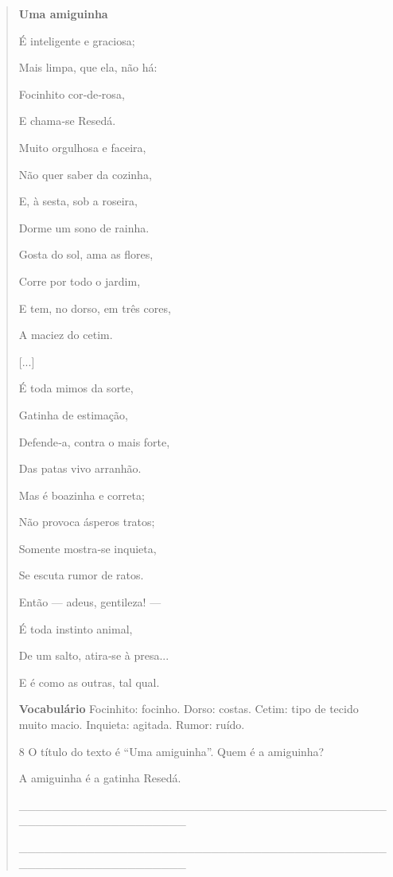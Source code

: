 \begin{quote}
\textbf{Uma amiguinha}

É inteligente e graciosa;

Mais limpa, que ela, não há:

Focinhito cor‑de‑rosa,

E chama‑se Resedá.


Muito orgulhosa e faceira,

Não quer saber da cozinha,

E, à sesta, sob a roseira,

Dorme um sono de rainha.


Gosta do sol, ama as flores,

Corre por todo o jardim,

E tem, no dorso, em três cores,

A maciez do cetim.


{[}...{]}


É toda mimos da sorte,

Gatinha de estimação,

Defende‑a, contra o mais forte,

Das patas vivo arranhão.


Mas é boazinha e correta;

Não provoca ásperos tratos;

Somente mostra‑se inquieta,

Se escuta rumor de ratos.
 

Então --- adeus, gentileza! ---

É toda instinto animal,

De um salto, atira‑se à presa...

E é como as outras, tal qual.


\textbf{Vocabulário}
Focinhito: focinho.
Dorso: costas.
Cetim: tipo de tecido muito macio.
Inquieta: agitada.
Rumor: ruído.

\num{8} O título do texto é ``Uma amiguinha''. Quem é a amiguinha?

A amiguinha é a gatinha Resedá.

\_\_\_\_\_\_\_\_\_\_\_\_\_\_\_\_\_\_\_\_\_\_\_\_\_\_\_\_\_\_\_\_\_\_\_\_\_\_\_\_\_\_\_\_\_\_\_\_\_\_\_\_\_\_\_\_\_\_\_\_\_\_\_\_

\_\_\_\_\_\_\_\_\_\_\_\_\_\_\_\_\_\_\_\_\_\_\_\_\_\_\_\_\_\_\_\_\_\_\_\_\_\_\_\_\_\_\_\_\_\_\_\_\_\_\_\_\_\_\_\_\_\_\_\_\_\_\_\_


\end{quote}
